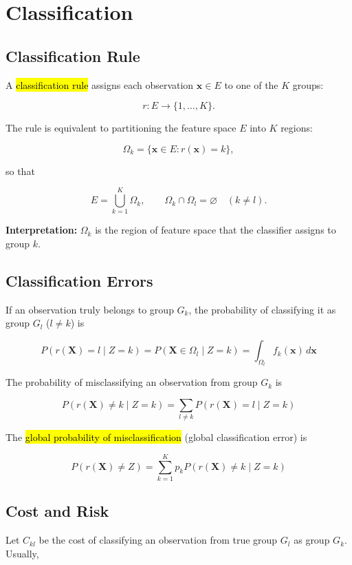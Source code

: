 \section{Classification}

\subsection{Classification Rule}

A \hl{classification rule} assigns each observation $\mathbf{x}\in E$ to one
of the $K$ groups:

$$
r:E\rightarrow\{1,\ldots,K\}.
$$

The rule is equivalent to partitioning the feature space $E$ into $K$
regions:

$$
\Omega_k=\{\mathbf{x}\in E:r(\mathbf{x})=k\},
$$

so that

$$
E=\bigcup_{k=1}^K\Omega_k,
\qquad
\Omega_k\cap\Omega_l=\varnothing\quad(k\neq l).
$$

\textbf{Interpretation:} $\Omega_k$ is the region of feature space that the
classifier assigns to group $k$.

\subsection{Classification Errors}

If an observation truly belongs to group $G_k$, the probability of classifying
it as group $G_l$ ($l\neq k$) is

$$
\boxed{
P(r(\mathbf{X})=l\mid Z=k)
=
P(\mathbf{X}\in\Omega_l\mid Z=k)
=
\int_{\Omega_l}f_k(\mathbf{x})\,d\mathbf{x}
}
$$

The probability of misclassifying an observation from group $G_k$ is

$$
\boxed{
P(r(\mathbf{X})\neq k\mid Z=k)
=
\sum_{l\neq k}P(r(\mathbf{X})=l\mid Z=k)
}
$$

The \hl{global probability of misclassification} (global classification
error) is

$$
\boxed{
P(r(\mathbf{X})\neq Z)
=
\sum_{k=1}^K
p_kP(r(\mathbf{X})\neq k\mid Z=k)
}
$$

\subsection{Cost and Risk}

Let $C_{kl}$ be the cost of classifying an observation from true group
$G_l$ as group $G_k$. Usually,

